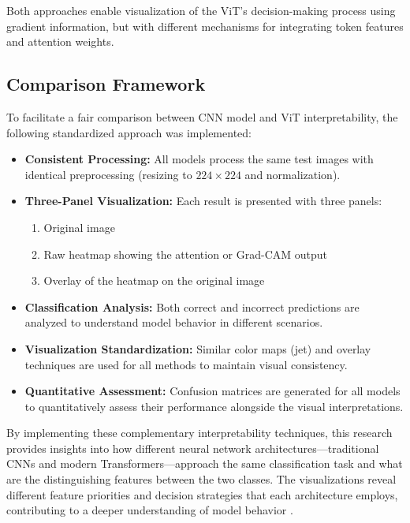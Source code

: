 \documentclass[a4paper,12pt]{report}
\begin{document}
Both approaches enable visualization of the ViT's decision-making process using gradient information, but with different mechanisms for integrating token features and attention weights.

\subsection{Comparison Framework}

To facilitate a fair comparison between CNN model and ViT interpretability, the following standardized approach was implemented:

\begin{itemize}
\item \textbf{Consistent Processing:} All models process the same test images with identical preprocessing (resizing to $224 \times 224$ and normalization).
\item \textbf{Three-Panel Visualization:} Each result is presented with three panels:
\begin{enumerate}
\item Original image
\item Raw heatmap showing the attention or Grad-CAM output
\item Overlay of the heatmap on the original image
\end{enumerate}
\item \textbf{Classification Analysis:} Both correct and incorrect predictions are analyzed to understand model behavior in different scenarios.
\item \textbf{Visualization Standardization:} Similar color maps (jet) and overlay techniques are used for all methods to maintain visual consistency.
\item \textbf{Quantitative Assessment:} Confusion matrices are generated for all models to quantitatively assess their performance alongside the visual interpretations.
\end{itemize}

By implementing these complementary interpretability techniques, this research provides insights into how different neural network architectures—traditional CNNs and modern Transformers—approach the same classification task and what are the distinguishing features between the two classes. The visualizations reveal different feature priorities and decision strategies that each architecture employs, contributing to a deeper understanding of model behavior \cite{Dosovitskiy2020}.


    
\end{document}

